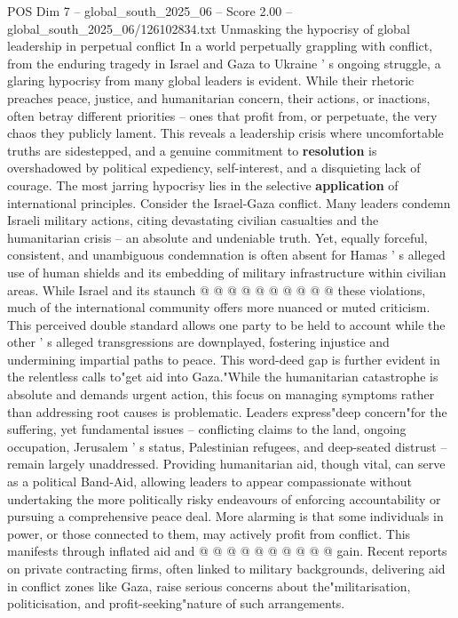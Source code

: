 \begin{textsample}{POS Dim 7 – global\_south\_2025\_06 – Score 2.00 – global\_south\_2025\_06/126102834.txt}  \label{ex:f7_pos_179}
Unmasking the hypocrisy of global leadership in perpetual conflict In a world perpetually grappling with conflict, from the enduring tragedy in Israel and Gaza to Ukraine ' s ongoing struggle, a glaring hypocrisy from many global leaders is evident.
While their rhetoric preaches peace, justice, and humanitarian concern, their actions, or inactions, often betray different priorities -- ones that profit from, or perpetuate, the very chaos they publicly lament.
This reveals a leadership crisis where uncomfortable truths are sidestepped, and a genuine commitment to \textbf{resolution} is overshadowed by political expediency, self-interest, and a disquieting lack of courage.
The most jarring hypocrisy lies in the selective \textbf{application} of international principles.
Consider the Israel-Gaza conflict.
Many leaders condemn Israeli military actions, citing devastating civilian casualties and the humanitarian crisis -- an absolute and undeniable truth.
Yet, equally forceful, consistent, and unambiguous condemnation is often absent for Hamas ' s alleged use of human shields and its embedding of military infrastructure within civilian areas.
While Israel and its staunch @ @ @ @ @ @ @ @ @ @ these violations, much of the international community offers more nuanced or muted criticism.
This perceived double standard allows one party to be held to account while the other ' s alleged transgressions are downplayed, fostering injustice and undermining impartial paths to peace.
This word-deed gap is further evident in the relentless calls to"get aid into Gaza."While the humanitarian catastrophe is absolute and demands urgent action, this focus on managing symptoms rather than addressing root causes is problematic.
Leaders express"deep concern"for the suffering, yet fundamental issues -- conflicting claims to the land, ongoing occupation, Jerusalem ' s status, Palestinian refugees, and deep-seated distrust -- remain largely unaddressed.
Providing humanitarian aid, though vital, can serve as a political Band-Aid, allowing leaders to appear compassionate without undertaking the more politically risky endeavours of enforcing accountability or pursuing a comprehensive peace deal.
More alarming is that some individuals in power, or those connected to them, may actively profit from conflict.
This manifests through inflated aid and @ @ @ @ @ @ @ @ @ @ gain.
Recent reports on private contracting firms, often linked to military backgrounds, delivering aid in conflict zones like Gaza, raise serious concerns about the"militarisation, politicisation, and profit-seeking"nature of such arrangements.

\end{textsample}
